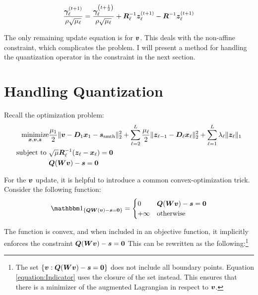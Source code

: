 \begin{equation}
\frac{\bm{\gamma}_{\ell}^{(t + 1)}}{\rho\sqrt{\mu_{\ell}}} = \frac{\bm{\gamma}_{\ell}^{\left(t + \frac{1}{2}\right)}}{\rho\sqrt{\mu_{\ell}}} + \bm{R}_{\ell}^{-1}\bm{z}_{\ell}^{(t + 1)} - \bm{R}^{-1}\bm{z}_{\ell}^{(t + 1)} 
\end{equation}


The only remaining update equation is for $\bm{v}$. This deals with the non-affine constraint, which complicates the problem. I will present a method for handling the quantization operator in the constraint in the next section.

\section{Handling Quantization}



Recall the optimization problem:
\begin{equation}
\begin{aligned}
\operatorname*{\text{minimize}}_{\bm{x},\bm{v},\bm{z}} & \frac{\mu_1}{2}\|\bm{v} - \bm{D}_1\bm{x}_1  - \bm{s}_{\text{smth}}\|_2^2 + \sum_{\ell = 2}^L \frac{\mu_{\ell}}{2}\|\bm{z}_{\ell - 1} - \bm{D}_{\ell}\bm{x}_{\ell}\|_2^2 + \sum_{\ell = 1}^L \lambda_{\ell}\|\bm{z}_{\ell}\|_1 \\
\text{subject to } & \sqrt{\mu}\bm{R}_{\ell}^{-1}(\bm{z}_{\ell} - \bm{x}_{\ell}) = \bm{0} \\
                   & \bm{Q}(\bm{W}\bm{v}) - \bm{s} = \bm{0}
\end{aligned}
\end{equation}


For the $\bm{v}$ update, it is helpful to introduce a common convex-optimization trick. Consider the following function:
\begin{equation}
\indicator_{\{\mQ\mW(\vv) - \vs = \vzero\}} = \begin{cases} 0 & \mQ(\mW\vv) - \vs = \vzero \\ + \infty & \text{otherwise} \end{cases}
\end{equation}

The function is convex, and when included in an objective function, it implicitly enforces the constraint $\bm{Q}(\bm{W}\bm{v}) - \bm{s} = \bm{0}$ This can be rewritten as the following:\footnote{The set $\{\bm{v}: \bm{Q}(\bm{W}\bm{v}) - \bm{s} = \bm{0}\}$ does not include all boundary points. Equation \ref{equation:Indicator} uses the closure of the set instead. This ensures that there is a minimizer of the augmented Lagrangian in respect to $\bm{v}$.} 

